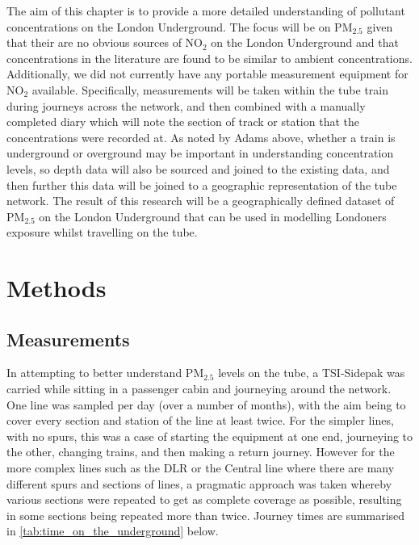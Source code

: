 The aim of this chapter is to provide a more detailed understanding of pollutant concentrations on the London Underground. The focus will be on PM$_{2.5}$ given that their are no obvious sources of NO$_{2}$ on the London Underground and that concentrations in the literature are found to be similar to ambient concentrations. Additionally, we did not currently have any portable measurement equipment for NO$_{2}$ available. Specifically, measurements will be taken within the tube train during journeys across the network, and then combined with a manually completed diary which will note the section of track or station that the concentrations were recorded at. As noted by Adams above, whether a train is underground or overground may be important in understanding concentration levels, so depth data will also be sourced and joined to the existing data, and then further this data will be joined to a geographic representation of the tube network. The result of this research will be a geographically defined dataset of PM$_{2.5}$ on the London Underground that can be used in modelling Londoners exposure whilst travelling on the tube.

\section{Methods}
\label{sec:3methods}

\subsection{Measurements}
\label{measurements}

In attempting to better understand PM$_{2.5}$ levels on the tube, a TSI-Sidepak was carried while sitting in a passenger cabin and journeying around the network. One line was sampled per day (over a number of months), with the aim being to cover every section and station of the line at least twice. For the simpler lines, with no spurs, this was a case of starting the equipment at one end, journeying to the other, changing trains, and then making a return journey. However for the more complex lines such as the DLR or the Central line where there are many different spurs and sections of lines, a pragmatic approach was taken whereby various sections were repeated to get as complete coverage as possible, resulting in some sections being repeated more than twice. Journey times are summarised in \autoref{tab:time_on_the_underground} below.

